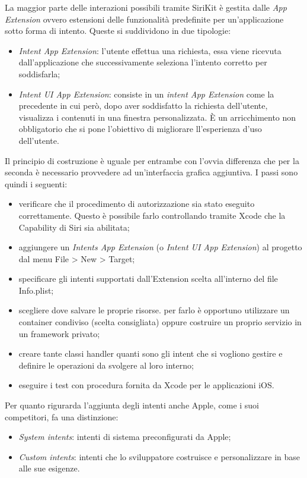 		La maggior parte delle interazioni possibili tramite SiriKit è gestita dalle \emph{App Extension} ovvero estensioni delle funzionalità predefinite per un'applicazione sotto forma di intento. Queste si suddividono in due tipologie:
		\begin{itemize}
			\item \emph{Intent App Extension}: l’utente effettua una richiesta, essa viene ricevuta dall’applicazione che successivamente seleziona l’intento corretto per soddisfarla;
			\item \emph{Intent UI App Extension}: consiste in un \emph{intent App Extension} come la precedente in cui però, dopo aver soddisfatto la richiesta dell’utente, visualizza i contenuti in una finestra personalizzata. È un arricchimento non obbligatorio che si pone l’obiettivo di migliorare ll'esperienza d'uso dell'utente.
		\end{itemize}
		Il principio di costruzione è uguale per entrambe con l'ovvia differenza che per la seconda è necessario provvedere ad un'interfaccia grafica aggiuntiva. I passi sono quindi i seguenti:
		\begin{itemize}
			\item verificare che il procedimento di autorizzazione sia stato eseguito correttamente. Questo è possibile farlo controllando tramite Xcode che la Capability di Siri sia abilitata;
			\item aggiungere un \emph{Intents App Extension} (o \emph{Intent UI App Extension}) al progetto dal menu File > New > Target;
			\item specificare gli intenti supportati dall’Extension scelta all’interno del file Info.plist;
			\item scegliere dove salvare le proprie risorse. per farlo è opportuno utilizzare un container condiviso (scelta consigliata) oppure costruire un proprio servizio in un framework privato;
			\item creare tante classi handler quanti sono gli intent che si vogliono gestire e definire le operazioni da svolgere al loro interno;
			\item eseguire i test con procedura fornita da Xcode per le applicazioni iOS.
		\end{itemize}
		Per quanto rigurarda l'aggiunta degli intenti anche Apple, come i suoi competitori, fa una distinzione:
		\begin{itemize}
			\item \emph{System intents}: intenti di sistema preconfigurati da Apple;
			\item \emph{Custom intents}: intenti che lo sviluppatore costruisce e personalizzare in base alle sue esigenze.
		\end{itemize}
		
